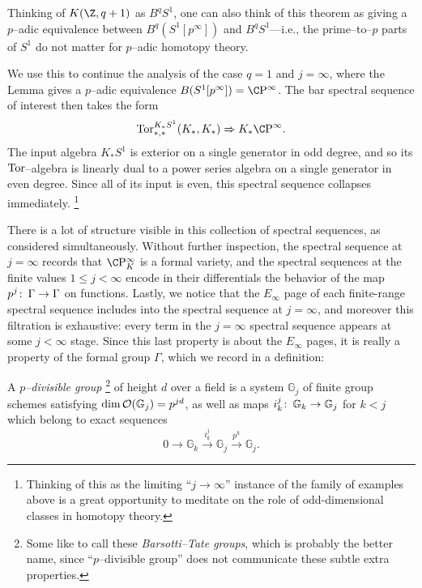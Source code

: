 \begin{remark}
Thinking of \(K(\Z, q+1)\) as \(B^q S^1\), one can also think of this theorem as giving a \(p\)--adic equivalence between \(B^q(S^1[p^\infty])\) and \(B^q S^1\)---i.e., the prime--to--\(p\) parts of \(S^1\) do not matter for \(p\)--adic homotopy theory.
\end{remark}

We use this to continue the analysis of the case \(q = 1\) and \(j = \infty\), where the Lemma gives a \(p\)--adic equivalence \(B(S^1[p^\infty]) = \CP^\infty\).
The bar spectral sequence of interest then takes the form \[\Tor^{K_* S^1}_{*, *}(K_*, K_*) \Rightarrow K_* \CP^\infty.\]
The input algebra \(K_* S^1\) is exterior on a single generator in odd degree, and so its \(\operatorname{Tor}\)--algebra is linearly dual to a power series algebra on a single generator in even degree.
Since all of its input is even, this spectral sequence collapses immediately.%
\footnote{%
Thinking of this as the limiting ``\(j \to \infty\)'' instance of the family of examples above is a great opportunity to meditate on the role of odd-dimensional classes in homotopy theory.
}

There is a lot of structure visible in this collection of spectral sequences, as considered simultaneously.
Without further inspection, the spectral sequence at \(j = \infty\) records that \(\CP^\infty_K\) is a formal variety, and the spectral sequences at the finite values \(1 \le j < \infty\) encode in their differentials the behavior of the map \(p^j\colon\thinspace \Gamma \to \Gamma\) on functions.
Lastly, we notice that the \(E_\infty\) page of each finite-range spectral sequence includes into the spectral sequence at \(j = \infty\), and moreover this filtration is exhaustive: every term in the \(j = \infty\) spectral sequence appears at some \(j < \infty\) stage.
Since this last property is about the \(E_\infty\) pages, it is really a property of the formal group \(\Gamma\), which we record in a definition:

\begin{definition}\label{DefnPDivGp}
A \textit{\(p\)--divisible group}%
\footnote{%
Some like to call these \textit{Barsotti--Tate groups}, which is probably the better name, since ``\(p\)--divisible group'' does not communicate these subtle extra properties.
}
of height \(d\) over a field is a system \(\mathbb G_j\) of finite group schemes satisfying \(\operatorname{dim} \mathcal{O}(\mathbb G_j) = p^{jd}\), as well as maps \(i_k^j\colon\thinspace \mathbb G_k \to \mathbb G_j\) for \(k < j\) which belong to exact sequences \[0 \to \mathbb G_k \xrightarrow{i_k^j} \mathbb G_j \xrightarrow{p^k} \mathbb G_j.\]
\end{definition}

